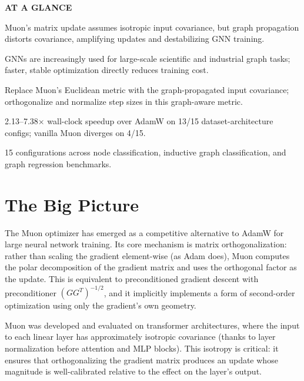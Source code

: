 \documentclass[10pt,twocolumn]{article}
\begin{document}
\begin{mdframed}[backgroundcolor=boxgray,linecolor=rulered,linewidth=1pt,
    innerleftmargin=6pt,innerrightmargin=6pt,
    innertopmargin=6pt,innerbottommargin=6pt]
\textbf{\small AT A GLANCE}\par\vspace{4pt}
\begin{description}[leftmargin=0pt,labelsep=4pt,itemsep=2pt,parsep=0pt,
    font=\small\bfseries]
  \item[Problem:] Muon's matrix update assumes isotropic input covariance, but
    graph propagation distorts covariance, amplifying updates and destabilizing
    GNN training.
  \item[Why it matters:] GNNs are increasingly used for large-scale scientific
    and industrial graph tasks; faster, stable optimization directly reduces
    training cost.
  \item[Method:] Replace Muon's Euclidean metric with the graph-propagated input
    covariance; orthogonalize and normalize step sizes in this graph-aware metric.
  \item[Result:] 2.13--7.38$\times$ wall-clock speedup over AdamW on 13/15
    dataset-architecture configs; vanilla Muon diverges on 4/15.
  \item[Evidence:] 15 configurations across node classification, inductive graph
    classification, and graph regression benchmarks.
\end{description}
\end{mdframed}

\section{The Big Picture}

The Muon optimizer has emerged as a competitive alternative to AdamW for
large neural network training. Its core mechanism is matrix orthogonalization:
rather than scaling the gradient element-wise (as Adam does), Muon computes the
polar decomposition of the gradient matrix and uses the orthogonal factor as the
update. This is equivalent to preconditioned gradient descent with preconditioner
$(GG^T)^{-1/2}$, and it implicitly implements a form of second-order optimization
using only the gradient's own geometry.

Muon was developed and evaluated on transformer architectures, where the input
to each linear layer has approximately isotropic covariance (thanks to layer
normalization before attention and MLP blocks). This isotropy is critical: it
ensures that orthogonalizing the gradient matrix produces an update whose
magnitude is well-calibrated relative to the effect on the layer's output.
\end{document}
